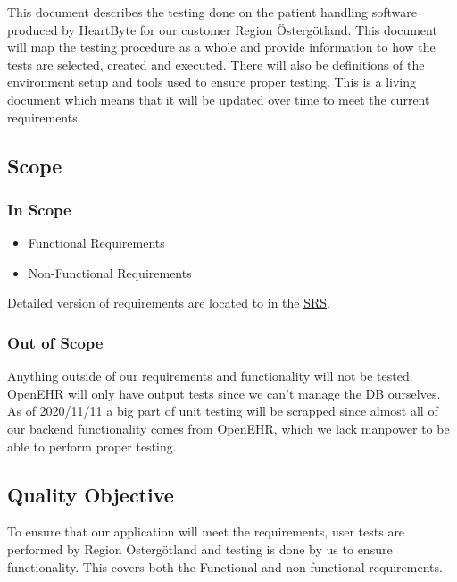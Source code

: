 
This document describes the testing done on the patient handling software produced by HeartByte for our customer Region Östergötland. This document will map the testing procedure as a whole and provide information to how the tests are selected, created and executed. There will also be definitions of the environment setup and tools used to ensure proper testing. This is a living document which means that it will be updated over time to meet the current requirements.

\subsection{Scope}
\subsubsection{In Scope}

\begin{itemize}
  \item Functional Requirements
\end{itemize}


\begin{itemize}
    \item Non-Functional Requirements 
\end{itemize}

  Detailed version of requirements are located to in the \href{https://gitlab.liu.se/tddc88-company-3-2020/deploy/-/tree/Document_branch/Software\%20Requirements\%20Specification}{\underline SRS}. 

  
  


\subsubsection{Out of Scope}
Anything outside of our requirements and functionality will not be tested. OpenEHR will only have output tests since we can't manage the DB ourselves. As of 2020/11/11 a big part of unit testing will be scrapped since almost all of our backend functionality comes from OpenEHR, which we lack manpower to be able to perform proper testing.
\subsection{Quality Objective}
To ensure that our application will meet the requirements, user tests are performed by Region Östergötland and testing is done by us to ensure functionality. This covers both the Functional and non functional requirements. 

